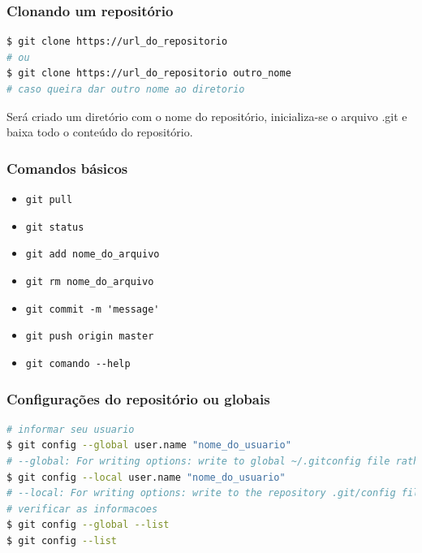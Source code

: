 \begin{frame}[fragile]
\frametitle{Clonando um repositório}
\begin{lstlisting}[language=bash, label=lst-git-repo2, caption={Clonando um repositório.}, postbreak=\mbox{$\hookrightarrow$\space}, basicstyle=\fontsize{8}{10}\selectfont\ttfamily]
$ git clone https://url_do_repositorio
# ou
$ git clone https://url_do_repositorio outro_nome
# caso queira dar outro nome ao diretorio
\end{lstlisting}

Será criado um diretório com o nome do repositório, inicializa-se o arquivo .git
e baixa todo o conteúdo do repositório.
\end{frame}


\begin{frame}[fragile]
\frametitle{Comandos básicos}

\begin{itemize}
\item \verb|git pull|
\item \verb|git status|
\item \verb|git add nome_do_arquivo|
\item \verb|git rm nome_do_arquivo|
\item \verb|git commit -m 'message'|
\item \verb|git push origin master|
\item \verb|git comando --help|
\end{itemize}

\end{frame}

\begin{frame}[fragile]
\frametitle{Configurações do repositório ou globais}
\begin{lstlisting}[language=bash, label=lst-git-conf1, caption={Configurações do git.}, postbreak=\mbox{$\hookrightarrow$\space}, basicstyle=\fontsize{8}{10}\selectfont\ttfamily]
# informar seu usuario
$ git config --global user.name "nome_do_usuario"
# --global: For writing options: write to global ~/.gitconfig file rather than the repository .git/config
$ git config --local user.name "nome_do_usuario"
# --local: For writing options: write to the repository .git/config file.
# verificar as informacoes
$ git config --global --list 
$ git config --list 
\end{lstlisting}
\end{frame}


